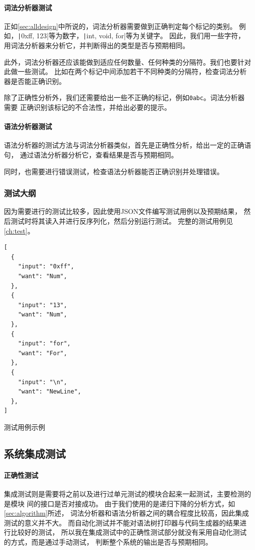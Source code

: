 \paragraph{词法分析器测试}

正如\autoref{sec:alldesign}中所说的，词法分析器需要做到正确判定每个标记的类别。
例如，\texttt|0xff, 123|等为数字，\texttt|int, void, for|等为关键字。
因此，我们用一些字符，用词法分析器来分析它，并判断得出的类型是否与预期相同。

此外，词法分析器还应该能做到适应任何数量、任何种类的分隔符。我们也要针对此做一些测试。
比如在两个标记中间添加若干不同种类的分隔符，检查词法分析器是否能正确识别。

除了正确性分析外，我们还需要给出一些不正确的标记，例如{\tt 0abc}。词法分析器需要
正确识别该标记的不合法性，并给出必要的提示。

\paragraph{语法分析器测试}

语法分析器的测试方法与词法分析器类似，首先是正确性分析，给出一定的正确语句，
通过语法分析器分析它，查看结果是否与预期相同。

同时，也需要进行错误测试，检查语法分析器能否正确识别并处理错误。

\subsubsection{测试大纲}

因为需要进行的测试比较多，因此使用JSON文件编写测试用例以及预期结果，
然后测试时将其读入并进行反序列化，然后分别运行测试。
完整的测试用例见\autoref{ch:test}。

\begin{listing}[hbt]
\begin{verbatim}
[
  {
    "input": "0xff",
    "want": "Num",
  },
  {
    "input": "13",
    "want": "Num",
  },
  {
    "input": "for",
    "want": "For",
  },
  {
    "input": "\n",
    "want": "NewLine",
  },
]
\end{verbatim}
\caption{测试用例示例}
\end{listing}

\subsection{系统集成测试}

\paragraph{正确性测试}
集成测试则是需要将之前以及进行过单元测试的模块合起来一起测试，主要检测的是模块
间的接口是否对接成功。
由于我们使用的是递归下降的分析方式，如\autoref{sec:algorithm}所述，
词法分析器和语法分析器之间的耦合程度比较高，因此集成测试的意义并不大。
而自动化测试并不能对语法树打印器与代码生成器的结果进行比较好的测试，
所以我在集成测试中的正确性测试部分就没有采用自动化测试的方式，而是通过手动测试，
判断整个系统的输出是否与预期相同。

